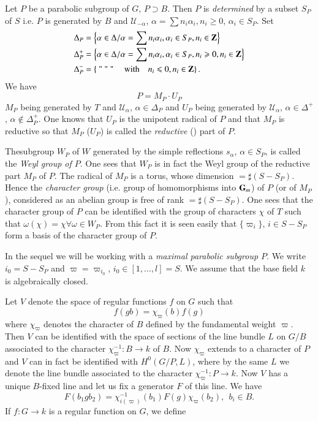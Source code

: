 Let $P$ be a parabolic subgroup of $G$, $P\supset B$. Then $P$ is {\em determined } by a subset $S_P$ of $S$ i.e. $P$ is generated by $B$ and $\mathscr{U}_{-\alpha}$, $\alpha = \sum n_i \alpha_i, n_i \geqslant 0$, $\alpha_i \in S_P$. Set
\begin{align*}
\Delta_P & = \left\{\alpha \in\Delta /\alpha = \sum n_i \alpha_i, \alpha_i \in S_P, n_i \in \mathbf{Z} \right\}\\
\Delta^+_P & = \left\{\alpha \in \Delta / \alpha = \sum n_i \alpha_i, \alpha_i \in S_P, n_i \geqslant 0, n_i \in \mathbf{Z} \right\}\\
\Delta_{P}^- & = \left\{  \text{ ~~ " ~~ " ~~ " ~~ \quad with}\quad n_i \leqslant 0, n_i \in\mathbf{Z}\right\}.
\end{align*}
We have
$$
P= M_P \cdot U_P
$$
$M_P$ being generated by $T$ and $\mathscr{U}_\alpha$, $\alpha \in \Delta_P$ and $U_P$ being generated by $\mathscr{U}_\alpha$, $\alpha \in \Delta^+$, $\alpha \not\in \Delta^+_P$. One knows that $U_P$ is the unipotent radical of $P$ and that $M_P$ is reductive so that $M_P$ (\resp $U_P$) is called the {\em reductive} () part of $P$.

The\pageoriginale subgroup $W_P$ of $W$ generated by the simple reflections $s_\alpha$, $\alpha \in S_P$, is called the {\em Weyl group of $P$}. One sees that $W_P$ is in fact the Weyl group of the reductive part $M_P$ of $P$. The radical of $M_P$ is a torus, whose dimension $= \sharp (S - S_P)$. Hence the {\em character group} (i.e. group of homomorphisms into $\mathbf{G}_m$) of $P$ (or of $M_P$), considered as an abelian group is free of rank $= \sharp (S - S_P)$. One sees  that the character group of $P$ can be identified with the group of characters $\chi$ of $T$ such that $\omega(\chi) =\chi \forall \omega \in W_P$. From this fact it is seen easily that $\{\varpi_i\}$, $i \in S - S_P$ form a basis of the character group of $P$.

In the sequel we will be working with a  {\em maximal parabolic subgroup $P$}. We write $i_0 = S - S_P$ and $\varpi = \varpi_{i_0}$, $i_0 \in [1, \ldots, l] =S$. We assume that the base field $k$ is algebraically closed.

Let $V$ denote the space of regular functions $f$ on $G$ such that 
$$
f(gb) = \chi_{\varpi} (b) f(g)
$$
where $\chi_{\varpi}$ denotes the character of $B$ defined by the fundamental weight ${\varpi}$. Then $V$ can be identified with the space of sections of the line bundle $L$ on $G/B$ associated to the character $\chi_{\varpi}^{-1}: B \to k$ of $B$. Now $\chi_{\varpi}$ extends to a character of $P$ and $V$ can in fact be identified with $H^0(G/P, L)$, where by the same $L$ we denote the line bundle associated to the character $\chi_{\varpi}^{-1}:P \to k$. Now $V$ has a unique $B$-fixed line and let us fix a generator $F$ of this line. We have 
$$
F(b_1 g b_2) = \chi^{-1}_{i(\varpi)} (b_1) F(g) \chi_{\varpi} (b_2), ~~ b_i \in B.
$$
If $f: G \to k$ is a regular function on $G$, we define 

